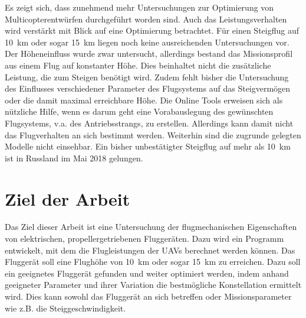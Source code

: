 Es zeigt sich, dass zunehmend mehr Untersuchungen zur Optimierung von Multicopterentwürfen durchgeführt worden sind. Auch das Leistungsverhalten wird verstärkt mit Blick auf eine Optimierung betrachtet. Für einen Steigflug auf \SI{10}{km} oder sogar \SI{15}{km} liegen noch keine ausreichenden Untersuchungen vor. Der Höheneinfluss wurde zwar untersucht, allerdings bestand das Missionsprofil aus einem Flug auf konstanter Höhe. Dies beinhaltet nicht die zusätzliche Leistung, die zum Steigen benötigt wird. Zudem fehlt bisher die Untersuchung des Einflusses verschiedener Parameter des Flugsystems auf das Steigvermögen oder die damit maximal erreichbare Höhe. Die Online Tools erweisen sich als nützliche Hilfe, wenn es darum geht eine Vorabauslegung des gewünschten Flugsystems, v.a. des Antriebsstrangs, zu erstellen. Allerdings kann damit nicht das Flugverhalten an sich bestimmt werden. Weiterhin sind die zugrunde gelegten Modelle nicht einsehbar. Ein bisher unbestätigter Steigflug auf mehr als \SI{10}{km} ist \cite{Anderson.2018} in Russland im Mai 2018 gelungen. 


\section{Ziel der Arbeit}
\label{sec:ziel_der_atrbeit}
Das Ziel dieser Arbeit ist eine Untersuchung der flugmechanischen Eigenschaften von elektrischen, propellergetriebenen Fluggeräten. Dazu wird ein Programm entwickelt, mit dem die Flugleistungen der UAVs berechnet werden können. Das Fluggerät soll eine Flughöhe von \SI{10}{km} oder sogar \SI{15}{km} zu erreichen. Dazu soll ein geeignetes Fluggerät gefunden und weiter optimiert werden, indem anhand geeigneter Parameter und ihrer Variation die bestmögliche Konstellation ermittelt wird. Dies kann sowohl das Fluggerät an sich betreffen oder Missionsparameter wie z.B. die Steiggeschwindigkeit.



